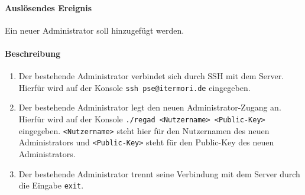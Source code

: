 \paragraph{Auslösendes Ereignis}
Ein neuer \Gls{Administrator} soll hinzugefügt werden.
\paragraph{Beschreibung}
\begin{enumerate}
    \item   Der bestehende \Gls{Administrator} verbindet sich durch \Gls{SSH} mit dem Server.
            Hierfür wird auf der Konsole \texttt{ssh pse@itermori.de} eingegeben.
    \item   Der bestehende \Gls{Administrator} legt den neuen Administrator-Zugang an.
            Hierfür wird auf der Konsole \texttt{./regad <Nutzername> <Public-Key>} eingegeben.
            \texttt{<Nutzername>} steht hier für den Nutzernamen des neuen \Gls{Administrator}s
            und \texttt{<Public-Key>} steht für den \Gls{Public-Key} des neuen \Gls{Administrator}s.
    \item   Der bestehende Administrator trennt seine Verbindung mit dem \Gls{Server} durch die Eingabe \texttt{exit}.
\end{enumerate}
